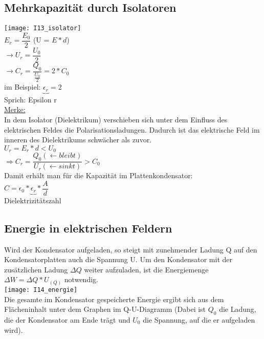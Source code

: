 \subsection{Mehrkapazität durch Isolatoren}
\texttt{[image: I13\_isolator]} \\
\vspace{2mm}
$ E_{r} = \dfrac{E_{0}}{2} $ \hspace{20mm} (U = $ E \ast d $) 
\vspace{4mm} \\
$ \rightarrow U_{r} = \dfrac{U_{0}}{2} $
\vspace{4mm} \\
$ \rightarrow C_{r} = \dfrac{Q_{0}}{\frac{U_{0}}{2}} = 2 \ast C_{0} $
\vspace{6mm} \\
im Beispiel: $ \underbrace{\epsilon_{r}} = 2 $ \\
\hspace{12mm} Sprich: Epsilon r
\vspace{5mm} \\
\underline{Merke:} \\
In dem Isolator (Dielektrikum) verschieben sich unter dem Einfluss des elektrischen Feldes die Polarisationsladungen. Dadurch ist das elektrische Feld im inneren des Dielektrikums schwächer als zuvor. 
\vspace{5mm} \\
$ U_{r} = E_{r} \ast d < U_{0} $
\vspace{5mm} \\
$ \Rightarrow C_{r} = \dfrac{Q_{0} (\leftarrow bleibt)}{U_{r} (\leftarrow sinkt)} > C_{0} $
\vspace{3mm} \\
Damit erhält man für die Kapazität im Plattenkondensator: 
\vspace{2mm} \\
$ C = \epsilon_{0} \ast \underbrace{\epsilon_{r}} \ast \dfrac{A}{d} $ \\
\vspace{1mm}
\hspace{4mm} Dielektrizitätszahl

\subsection{Energie in elektrischen Feldern}
Wird der Kondensator aufgeladen, so steigt mit zunehmender Ladung Q auf den Kondensatorplatten auch die Spannung U. Um den Kondensator mit der zusätzlichen Ladung $\Delta Q$ weiter aufzuladen, ist die Energiemenge $\Delta W = \Delta Q \ast U_{(Q)} $ notwendig.
\vspace{2mm} \\
\texttt{[image: I14\_energie]}
\vspace{2mm} \\
Die gesamte im Kondensator gespeicherte Energie ergibt sich aus dem Flächeninhalt unter dem Graphen im Q-U-Diagramm (Dabei ist $Q_{0}$ die Ladung, die der Kondensator am Ende trägt und $U_{0}$ die Spannung, auf die er aufgeladen wird).

